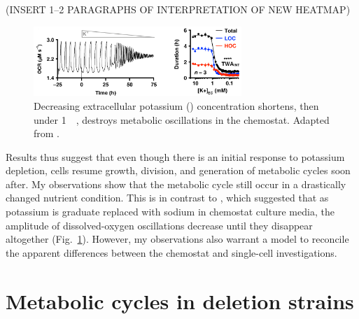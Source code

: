 (INSERT 1--2 PARAGRAPHS OF INTERPRETATION OF NEW HEATMAP)


\begin{figure}
  \centering
  \includegraphics[width=0.7\textwidth]{oneillEukaryoticCellBiology2020_4_adapted.png}
  \caption{
    Decreasing extracellular potassium () concentration shortens, then under \SI{1}{\milli\molar}, destroys metabolic oscillations in the chemostat.
    Adapted from \textcite{oneillEukaryoticCellBiology2020}.
  }
  \label{fig:biology-kdeficient-oneill}
\end{figure}

Results thus suggest that even though there is an initial response to potassium depletion, cells resume growth, division, and generation of metabolic cycles soon after.
My observations show that the metabolic cycle still occur in a drastically changed nutrient condition.
This is in contrast to \textcite{oneillEukaryoticCellBiology2020}, which suggested that as potassium is graduate replaced with sodium in chemostat culture media, the amplitude of dissolved-oxygen oscillations decrease until they disappear altogether (Fig.\ \ref{fig:biology-kdeficient-oneill}).
However, my observations also warrant a model to reconcile the apparent differences between the chemostat and single-cell investigations.


\section{Metabolic cycles in deletion strains}
\label{sec:biology-deletions}


